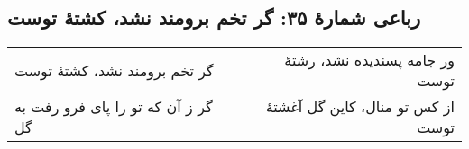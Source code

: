 \begin{center}
\section*{رباعی شمارهٔ ۳۵: گر تخم برومند نشد، کشتۀ توست}
\label{sec:035}
\begin{longtable}{l p{0.5cm} r}
گر تخم برومند نشد، کشتهٔ توست
&&
ور جامه پسندیده نشد، رشتهٔ توست
\\
گر ز آن که تو را پای فرو رفت به گل
&&
از کس تو منال، کاین گل آغشتهٔ توست
\\
\end{longtable}
\end{center}
